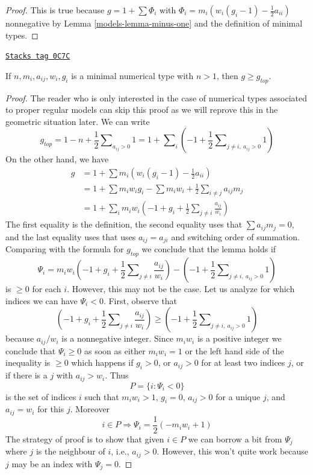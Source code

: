 \begin{proof}

This is true because $g = 1 + \sum \Phi_i$ with
$\Phi_i = m_i(w_i(g_i - 1) - \frac{1}{2} a_{ii})$ nonnegative
by Lemma \ref{models-lemma-minus-one} and the definition of minimal types.
\end{proof}

\begin{lemma}
\label{models-lemma-genus-nonnegative}
\href{https://stacks.math.columbia.edu/tag/0C7C}{\texttt{Stacks tag 0C7C}}

If $n, m_i, a_{ij}, w_i, g_i$ is a minimal numerical type
with $n > 1$, then $g \geq g_{top}$.
\end{lemma}

\begin{proof}

The reader who is only interested in the case of numerical types
associated to proper regular models can skip this proof as we will
reprove this in the geometric situation later.
We can write
$$
g_{top} = 1 - n + \frac{1}{2}\sum\nolimits_{a_{ij} > 0} 1 =
1 + \sum\nolimits_i (-1 +
\frac{1}{2}\sum\nolimits_{j \not = i,\ a_{ij} > 0} 1)
$$
On the other hand, we have
\begin{align*}
g & =
1 + \sum m_i(w_i(g_i - 1) - \frac{1}{2} a_{ii}) \\
& =
1 + \sum m_iw_ig_i - \sum m_iw_i +
\frac{1}{2} \sum\nolimits_{i \not = j} a_{ij}m_j \\
& =
1 + \sum\nolimits_i
m_iw_i(-1 + g_i + \frac{1}{2} \sum\nolimits_{j \not = i} \frac{a_{ij}}{w_i})
\end{align*}
The first equality is the definition, the second equality uses that
$\sum a_{ij}m_j = 0$, and the last equality uses that
uses $a_{ij} = a_{ji}$ and switching order of
summation. Comparing with the formula for $g_{top}$ we conclude
that the lemma holds if
$$
\Psi_i =
m_iw_i(-1 + g_i + \frac{1}{2} \sum\nolimits_{j \not = i} \frac{a_{ij}}{w_i})
- (-1 + \frac{1}{2}\sum\nolimits_{j \not = i,\ a_{ij} > 0} 1)
$$
is $\geq 0$ for each $i$. However, this may not be the case.
Let us analyze for which indices we can have $\Psi_i < 0$.
First, observe that
$$
(-1 + g_i + \frac{1}{2}\sum\nolimits_{j \not = i} \frac{a_{ij}}{w_i}) \geq
(-1 + \frac{1}{2}\sum\nolimits_{j \not = i,\ a_{ij} > 0} 1)
$$
because $a_{ij}/w_i$ is a nonnegative integer. Since $m_iw_i$ is
a positive integer we conclude that $\Psi_i \geq 0$ as soon as
either $m_iw_i = 1$ or the left hand side of the inequality is $\geq 0$
which happens if $g_i > 0$, or $a_{ij} > 0$ for at least two indices $j$, or
if there is a $j$ with $a_{ij} > w_i$. Thus
$$
P = \{i : \Psi_i < 0\}
$$
is the set of indices $i$ such that $m_iw_i > 1$, $g_i = 0$,
$a_{ij} > 0$ for a unique $j$, and $a_{ij} = w_i$ for this $j$.
Moreover
$$
i \in P \Rightarrow \Psi_i = \frac{1}{2}(-m_iw_i + 1)
$$
The strategy of proof is to show that given $i \in P$ we can borrow a bit
from $\Psi_j$ where $j$ is the neighbour of $i$, i.e., $a_{ij} > 0$.
However, this won't quite work because $j$ may be an index with $\Psi_j = 0$.


\end{proof}
